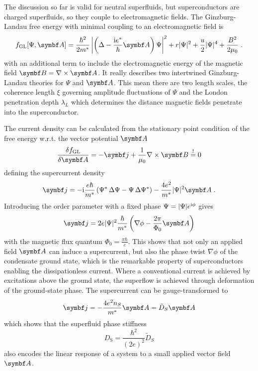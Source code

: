 \documentclass[../notes.tex]{subfiles}
\begin{document}
The discussion so far is valid for neutral superfluids, but superconductors are charged superfluids, so they couple to electromagnetic fields.
The Ginzburg-Landau free energy with minimal coupling to an electromagnetic field is
\begin{equation}
	f_{\mathrm{GL}} [\Psi, \vb{A}] = \frac{\hbar^2}{2 m^*} \left\vert \left( \Delta - \frac{\iu e^*}{\hbar} \vb{A} \right) \Psi \right\vert^2 + r \vert \Psi \vert^2 + \frac{u}{2} \vert \Psi \vert^4 + \frac{B^2}{2 \mu_0}
	\label{eq:GL energy with minimal coupling to EM field} \;.
\end{equation}
with an additional term to include the electromagnetic energy of the magnetic field \(\vb{B} = \nabla \times \vb{A}\).
It really describes two intertwined Ginzburg-Landau theories for \(\Psi\) and \(\vb{A}\).
This mean there are two length scales, the coherence length \(\xi\) governing amplitude fluctuations of \(\Psi\) and the London penetration depth \(\lambda_L\) which determines the distance magnetic fields penetrate into the superconductor.

The current density can be calculated from the stationary point condition of the free energy w.r.t. the vector potential \(\vb{A}\)
\begin{equation}
	\fdv{f_{\mathrm{GL}}}{\vb{A}} = -\vb{j} + \frac{1}{\mu_0} \nabla \times \vb{B} \overset{!}{=} 0
\end{equation}
defining the supercurrent density
\begin{equation}
	\vb{j} = -\iu \frac{e\hbar}{m^*} \left(\Psi^* \adif{\Psi} - \Psi \adif{\Psi^*}\right) - \frac{4 e^2}{m^*} \vert \Psi \vert^2 \vb{A} \;.
	\label{eq:supercurrent density GL theory with phase and vector potential}
\end{equation}
Introducing the order parameter with a fixed phase \(\Psi = \vert \Psi \vert e^{\mathrm{i} \phi}\) gives
\begin{equation}
	\vb{j} = 2 e \vert \Psi \vert^2 \frac{\hbar}{m^*} \left(\nabla \phi - \frac{2 \pi}{\Phi_0} \vb{A} \right)
\end{equation}
with the magnetic flux quantum \(\Phi_0 = \frac{\pi \hbar}{e}\).
This shows that not only an applied field \(\vb{A}\) can induce a supercurrent, but also the phase twist \(\nabla \phi\) of the condensate ground state, which is the remarkable property of superconductors enabling the dissipationless current.
Where a conventional current is achieved by excitations above the ground state, the superflow is achieved through deformation of the ground-state phase.
The supercurrent can be gauge-transformed to
\begin{equation}
	\vb{j} = -\frac{4e^2 n_S}{m^*} \vb{A} = \tilde{D}_S \vb{A}
\end{equation}
which shows that the superfluid phase stiffness
\begin{equation}
	D_{\mathrm{S}} = \frac{\hbar^2}{(2e)^2} \tilde{D}_S
\end{equation}
also encodes the linear response of a system to a small applied vector field \(\vb{A}\).
\end{document}
